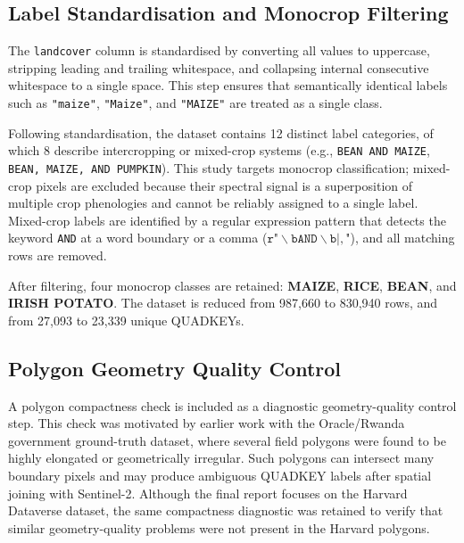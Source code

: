 \subsection{Label Standardisation and Monocrop Filtering}
\label{subsec:label_std}

The \texttt{landcover} column is standardised by converting all values to
uppercase, stripping leading and trailing whitespace, and collapsing
internal consecutive whitespace to a single space. This step ensures that
semantically identical labels such as \texttt{"maize"}, \texttt{"Maize"},
and \texttt{"MAIZE"} are treated as a single class.

Following standardisation, the dataset contains 12 distinct label
categories, of which 8 describe intercropping or mixed-crop systems
(e.g., \texttt{BEAN AND MAIZE}, \texttt{BEAN, MAIZE, AND PUMPKIN}). This
study targets monocrop classification; mixed-crop pixels are excluded
because their spectral signal is a superposition of multiple crop
phenologies and cannot be reliably assigned to a single label. Mixed-crop
labels are identified by a regular expression pattern that detects the
keyword \texttt{AND} at a word boundary or a comma
($\texttt{r"}\backslash\texttt{bAND}\backslash\texttt{b|},$"), and all
matching rows are removed.

After filtering, four monocrop classes are retained:
\textbf{MAIZE}, \textbf{RICE}, \textbf{BEAN}, and \textbf{IRISH POTATO}.
The dataset is reduced from 987,660 to 830,940 rows, and from 27,093 to
23,339 unique QUADKEYs.


\subsection{Polygon Geometry Quality Control}
\label{subsec:compactness}

A polygon compactness check is included as a diagnostic geometry-quality
control step. This check was motivated by earlier work with the Oracle/Rwanda
government ground-truth dataset, where several field polygons were found to
be highly elongated or geometrically irregular. Such polygons can intersect
many boundary pixels and may produce ambiguous QUADKEY labels after spatial
joining with Sentinel-2. Although the final report focuses on the Harvard
Dataverse dataset, the same compactness diagnostic was retained to verify
that similar geometry-quality problems were not present in the Harvard
polygons.

